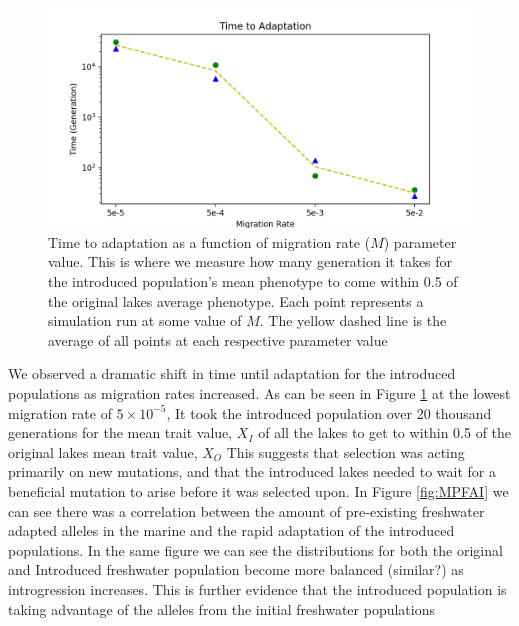 \documentclass{article}
\newcommand{\plr}[1]{\todo[linecolor=blue,backgroundcolor=blue!25,bordercolor=blue]{#1}}
\begin{document}
\begin{figure}
	\begin{center}
  		\includegraphics[width=0.8\linewidth]{matplotlibPlots/TimeToAdaptation.png}
  		\caption{Time to adaptation as a function of migration rate ($M$) parameter value. This is where we measure how many generation
		it takes for the introduced population's mean phenotype to come within 0.5 of the original lakes average phenotype. 
		Each point represents a simulation run at some value of $M$. 
		The yellow dashed line is the average of all points at each respective parameter value}
  		\label{fig:TimeToAdaptation}
	\end{center}
\end{figure}

We observed a dramatic shift in time until adaptation for the introduced populations
as migration rates increased. 
As can be seen in Figure \ref{fig:TimeToAdaptation} at the lowest migration rate of $5 \times 10^{-5}$,
It took the introduced population over 20 thousand generations for the mean trait value, $X_{I}$ of all the lakes to 
get to within 0.5 of the original lakes mean trait value, $X_{O}$
This suggests that selection was acting primarily on new mutations, and that the 
introduced lakes needed to wait for a beneficial mutation to arise before 
it was selected upon. 
In Figure \ref{fig:MPFAI} we can see there was a correlation between the amount of pre-existing freshwater adapted alleles in the 
marine and the rapid adaptation of the introduced populations. 
In the same figure we can see the distributions
for both the original and Introduced freshwater population become more balanced (similar?) as introgression increases.
This is further evidence that the introduced population is taking advantage of the alleles from the initial freshwater populations
\end{document}
